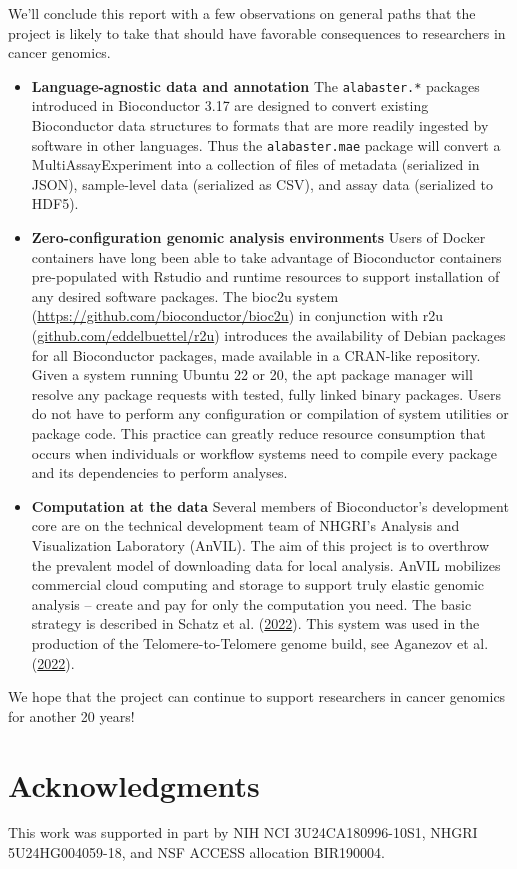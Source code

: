 We'll conclude this report with a few observations on
general paths that the project is likely to take that
should have favorable consequences to researchers in
cancer genomics.

\begin{itemize}
\item
  \textbf{Language-agnostic data and annotation} The \texttt{alabaster.*} packages
  introduced in Bioconductor 3.17 are designed to convert existing
  Bioconductor data structures to formats that are more readily ingested
  by software in other languages. Thus the \texttt{alabaster.mae}
  package will convert a MultiAssayExperiment into a collection
  of files of metadata (serialized in JSON), sample-level data
  (serialized as CSV), and assay data (serialized to HDF5).
\item
  \textbf{Zero-configuration genomic analysis environments} Users
  of Docker containers have long been able to take advantage of
  Bioconductor containers pre-populated with Rstudio and runtime
  resources to support installation of any desired software packages.
  The bioc2u system (\url{https://github.com/bioconductor/bioc2u}) in conjunction
  with r2u (\url{github.com/eddelbuettel/r2u}) introduces the
  availability of Debian packages for all Bioconductor packages,
  made available in a CRAN-like repository. Given a system running
  Ubuntu 22 or 20, the apt package manager will resolve any package
  requests with tested, fully linked binary packages. Users do not
  have to perform any configuration or compilation of system
  utilities or package code. This practice can greatly reduce
  resource consumption that occurs when individuals or
  workflow systems need to compile
  every package and its dependencies to perform analyses.
\item
  \textbf{Computation at the data} Several members of Bioconductor's
  development core are on the technical development team of
  NHGRI's Analysis and Visualization Laboratory (AnVIL). The aim
  of this project is to overthrow the prevalent model of downloading data for
  local analysis. AnVIL mobilizes commercial cloud computing and
  storage to support truly elastic genomic analysis -- create and
  pay for only the computation you need. The basic
  strategy is described in Schatz et al. (\protect\hyperlink{ref-Schatz2022}{2022}). This system was
  used in the production of the Telomere-to-Telomere
  genome build, see Aganezov et al. (\protect\hyperlink{ref-Aganezov2022}{2022}).
\end{itemize}

We hope that the project can continue to support researchers in cancer
genomics for another 20 years!

\section{Acknowledgments}\label{acknowledgments}

This work was supported in part by NIH NCI 3U24CA180996-10S1, NHGRI 5U24HG004059-18, and NSF ACCESS allocation BIR190004.
